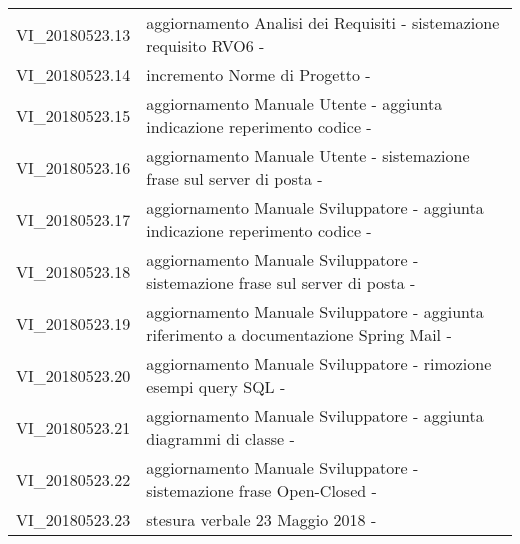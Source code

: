 \begin{center}
\begin{tabular}{c | p{11cm}}
        \rowcolor[gray]{.8} VI\_20180523.13 & aggiornamento Analisi dei Requisiti - sistemazione requisito RVO6 - \Mattia{} \\
        \rowcolor[gray]{.9} VI\_20180523.14 & incremento Norme di Progetto - \Cristian{} \\
        \rowcolor[gray]{.8} VI\_20180523.15 & aggiornamento Manuale Utente - aggiunta indicazione reperimento codice - \Carlo{} \\
        \rowcolor[gray]{.9} VI\_20180523.16 & aggiornamento Manuale Utente - sistemazione frase sul server di posta - \Carlo{} \\
        \rowcolor[gray]{.8} VI\_20180523.17 & aggiornamento Manuale Sviluppatore - aggiunta indicazione reperimento codice - \Luca{} \\
        \rowcolor[gray]{.9} VI\_20180523.18 & aggiornamento Manuale Sviluppatore - sistemazione frase sul server di posta - \Luca{} \\
        \rowcolor[gray]{.8} VI\_20180523.19 & aggiornamento Manuale Sviluppatore - aggiunta riferimento a documentazione Spring Mail - \Luca{} \\
        \rowcolor[gray]{.9} VI\_20180523.20 & aggiornamento Manuale Sviluppatore - rimozione esempi query SQL - \Luca{} \\
        \rowcolor[gray]{.8} VI\_20180523.21 & aggiornamento Manuale Sviluppatore - aggiunta diagrammi di classe - \Luca{} \\
        \rowcolor[gray]{.9} VI\_20180523.22 & aggiornamento Manuale Sviluppatore - sistemazione frase Open-Closed - \Luca{} \\
        \rowcolor[gray]{.8} VI\_20180523.23 & stesura verbale 23 Maggio 2018 - \Tommaso{} \\
        \end{tabular}
\end{center}
